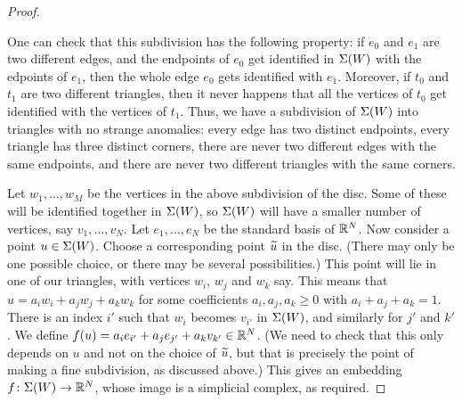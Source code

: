 \documentclass[reqno]{amsart}
\theoremstyle{definition}
\begin{document}
\begin{proof}
\begin{center}
 \end{center}
 One can check that this subdivision has the following property: if
 $e_0$ and $e_1$ are two different edges, and the endpoints of $e_0$
 get identified in $\Sigma(W)$ with the edpoints of $e_1$, then the whole
 edge $e_0$ gets identified with $e_1$.  Moreover, if $t_0$ and $t_1$
 are two different triangles, then it never happens that all the
 vertices of $t_0$ get identified with the vertices of $t_1$.  Thus,
 we have a subdivision of $\Sigma(W)$ into triangles with no strange
 anomalies: every edge has two distinct endpoints, every triangle has
 three distinct corners, there are never two different edges with the
 same endpoints, and there are never two different triangles with the
 same corners.  

 Let $w_1,\dotsc,w_M$ be the vertices in the above subdivision of the
 disc.  Some of these will be identified together in $\Sigma(W)$, so
 $\Sigma(W)$ will have a smaller number of vertices, say
 $v_1,\dotsc,v_N$.  Let $e_1,\dotsc,e_N$ be the standard basis of
 $\mathbb{R}^N$.  Now consider a point $u\in\Sigma(W)$.  Choose a corresponding
 point $\widetilde{u}$ in the disc.  (There may only be one possible choice,
 or there may be several possibilities.)  This point will lie in one
 of our triangles, with vertices $w_i$, $w_j$ and $w_k$ say.  This
 means that $u=a_iw_i+a_jw_j+a_kw_k$ for some coefficients
 $a_i,a_j,a_k\geq 0$ with $a_i+a_j+a_k=1$.  There is an index $i'$
 such that $w_i$ becomes $v_{i'}$ in $\Sigma(W)$, and similarly for $j'$
 and $k'$.  We define $f(u)=a_ie_{i'}+a_je_{j'}+a_kv_{k'}\in\mathbb{R}^N$.
 (We need to check that this only depends on $u$ and not on the choice
 of $\widetilde{u}$, but that is precisely the point of making a fine
 subdivision, as discussed above.)  This gives an embedding
 $f\colon\Sigma(W)\to\mathbb{R}^N$, whose image is a simplicial complex, as required.
\end{proof}
\end{document}
